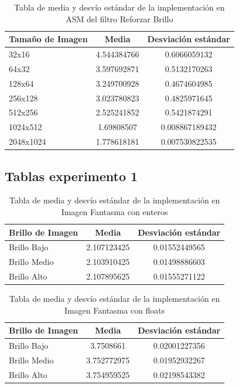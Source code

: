 \documentclass[a4paper]{article}
\begin{document}
\begin{table}[h!]
	\begin{center}
		\begin{tabular}{| l | c | c |}
			\hline
			Tamaño de Imagen & Media & Desviación estándar \\ \hline
			32x16	& 4.544384766	& 0.6066059132 \\
			64x32	& 3.597692871	 & 0.5132170263 \\
			128x64	& 3.249700928	& 0.4674604985 \\
			256x128	& 3.023780823	& 0.4825971645 \\
			512x256	& 2.525241852	& 0.5421874291 \\
			1024x512 & 1.69808507	& 0.008867189432\\ 
			2048x1024 & 1.778618181	& 0.007530822535 \\ \hline
		\end{tabular}
		\caption{Tabla de media y desvío estándar de la implementación en ASM del filtro Reforzar Brillo}
	\end{center}
\end{table}

\subsection{Tablas experimento 1}

\begin{table}[h!]
	\begin{center}
		\begin{tabular}{| l | c | c |}
			\hline
			Brillo de Imagen & Media & Desviación estándar \\ \hline
			Brillo Bajo	& 2.107123425	& 0.01552449565 \\
			Brillo Medio &	2.103910425	& 0.01498886603 \\
			Brillo Alto	& 2.107895625	& 0.01555271122 \\ \hline
		\end{tabular}
		\caption{Tabla de media y desvío estándar de la implementación en Imagen Fantasma con enteros}
	\end{center}
\end{table}

\begin{table}[h!]
	\begin{center}
		\begin{tabular}{| l | c | c |}
			\hline
			Brillo de Imagen & Media & Desviación estándar \\ \hline
			Brillo  Bajo	& 3.7508661	& 0.02001227356 \\
			Brillo Medio	& 3.752772975	& 0.01952932267 \\
			Brillo Alto	& 3.754959525 &	0.02198543382 \\ \hline
		\end{tabular}
		\caption{Tabla de media y desvío estándar de la implementación en Imagen Fantasma con floats}
	\end{center}
\end{table}
\end{document}
